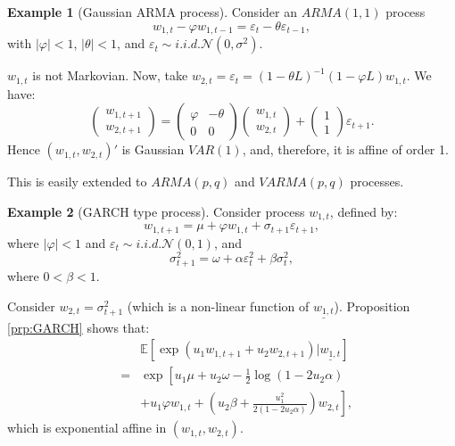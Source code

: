 \documentclass[
  12pt,
]{book}
\theoremstyle{definition}
\theoremstyle{definition}
\newtheorem{example}{Example}[chapter]
\theoremstyle{definition}
\theoremstyle{definition}
\theoremstyle{remark}
\begin{document}
\begin{example}[Gaussian ARMA process]
\protect\hypertarget{exm:GaussianARMA}{}\label{exm:GaussianARMA}Consider an \(ARMA(1,1)\) process
\[
w_{1,t} - \varphi w_{1,t-1} = \varepsilon_t-\theta \varepsilon_{t-1},
\]
with \(|\varphi | < 1\), \(|\theta| < 1\), and \(\varepsilon_t \sim i.i.d. \mathcal{N}(0, \sigma^2)\).

\(w_{1,t}\) is not Markovian. Now, take \(w_{2,t} = \varepsilon_t = (1-\theta L)^{-1}(1-\varphi L)w_{1,t}\). We have:
\[
\left(
\begin{array}{l}
w_{1,t+1} \\
w_{2,t+1}
\end{array}
\right) =
\left(
\begin{array}{ll}
\varphi & -\theta \\
0 &      0
\end{array}
\right)
\left(
\begin{array}{l}
w_{1,t} \\
w_{2,t}
\end{array}
\right) +
\left(
\begin{array}{l}
1 \\
1
\end{array}
\right) \varepsilon_{t+1}.
\]
Hence \((w_{1,t}, w_{2,t})'\) is Gaussian \(VAR(1)\), and, therefore, it is affine of order 1.

This is easily extended to \(ARMA(p,q)\) and \(VARMA(p,q)\) processes.
\end{example}

\begin{example}[GARCH type process]
\protect\hypertarget{exm:GARCH}{}\label{exm:GARCH}Consider process \(w_{1,t}\), defined by:
\[
w_{1,t+1}  = \mu + \varphi w_{1,t} + \sigma_{t+1} \varepsilon_{t+1},
\]
where \(|\varphi| < 1\) and \(\varepsilon_t \sim i.i.d. \mathcal{N}(0,1)\), and
\[
\sigma^2_{t+1} = \omega + \alpha \varepsilon^2_t + \beta \sigma^2_t,
\]
where \(0 < \beta < 1\).

Consider \(w_{2,t} = \sigma^2_{t+1}\) (which is a non-linear function of \(\underline{w_{1,t}}\)). Proposition \ref{prp:GARCH} shows that:
\begin{eqnarray*}
&& \mathbb{E}\left[\exp(u_1 w_{1,t+1} + u_2 w_{2,t+1})|\underline{w_{1,t}}\right] \\
&=& \exp\left[u_1 \mu + u_2 \omega - \frac{1}{2}   \log(1-2 u_2 \alpha) \right. \\
&&\left. +  u_1 \varphi w_{1,t} + (u_2\beta +  \frac{u^2_1}{2(1-2u_2\alpha)}) w_{2,t}\right],
\end{eqnarray*}
which is exponential affine in \((w_{1,t}, w_{2,t})\).
\end{example}
\end{document}
